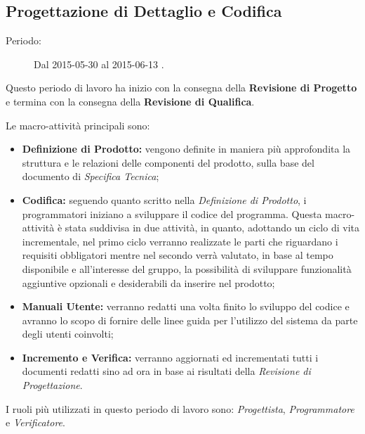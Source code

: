 \newpage
\subsection{Progettazione di Dettaglio e Codifica}
\begin{description}
	\item[Periodo:] Dal 2015-05-30 al 2015-06-13 .
\end{description}
Questo periodo di lavoro ha inizio con la consegna della \textbf{Revisione di Progetto} e termina con la consegna della \textbf{Revisione di Qualifica}. 

\noindent Le macro-attività principali sono:
\begin{itemize}
	\item \textbf{Definizione di Prodotto:} vengono definite in maniera più approfondita la struttura e le relazioni delle componenti del prodotto, sulla base del documento di \textit{Specifica Tecnica};
	\item \textbf{Codifica:} seguendo quanto scritto nella \textit{Definizione di Prodotto}, i programmatori iniziano a sviluppare il codice del programma. Questa macro-attività è stata suddivisa in due attività, in quanto, adottando un ciclo di vita incrementale, nel primo ciclo verranno realizzate le parti che riguardano i requisiti obbligatori mentre nel secondo verrà valutato, in base al tempo disponibile e all'interesse del gruppo, la possibilità di sviluppare funzionalità aggiuntive opzionali e desiderabili da inserire nel prodotto;
	\item \textbf{Manuali Utente:} verranno redatti una volta finito lo sviluppo del codice e avranno lo scopo di fornire delle linee guida per l'utilizzo del sistema da parte degli utenti coinvolti;
	\item \textbf{Incremento e Verifica:} verranno aggiornati ed incrementati tutti i documenti redatti sino ad ora in base ai risultati della \textit{Revisione di Progettazione}.
\end{itemize}
I ruoli più utilizzati in questo periodo di lavoro sono: \textit{Progettista}, \textit{Programmatore} e \textit{Verificatore}. 
